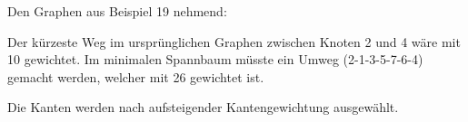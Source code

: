 \documentclass[a4paper, 12pt, margins=3cm]{homework}
\begin{document}
  \SetVertexNormal[Shape      = circle,
                 FillColor  = white,
                 LineWidth  = 1pt]

  \SetUpEdge[lw         = 1pt,
           color      = black,
           labelcolor = white,
           labeltext  = black]

  \GraphInit[vstyle=Normal] 


  \begin{problem}
    
  \end{problem}
  \begin{solution}

    Den Graphen aus Beispiel 19 nehmend:
    \begin{center}
      \def\svgwidth{0.8\textwidth}
    \end{center}
    Der kürzeste Weg im ursprünglichen Graphen zwischen Knoten 2 und 4 wäre mit 10
    gewichtet. Im minimalen Spannbaum müsste ein Umweg (2-1-3-5-7-6-4) gemacht
    werden, welcher mit 26 gewichtet ist.
  \end{solution}


  \begin{problem}
    
  \end{problem}
  \begin{solution}\hfill
    \begin{center}
      \def\svgwidth{0.8\textwidth}
    \end{center}

    Die Kanten werden nach aufsteigender Kantengewichtung ausgewählt.
    
  \end{solution}

\newpage
\end{document}
